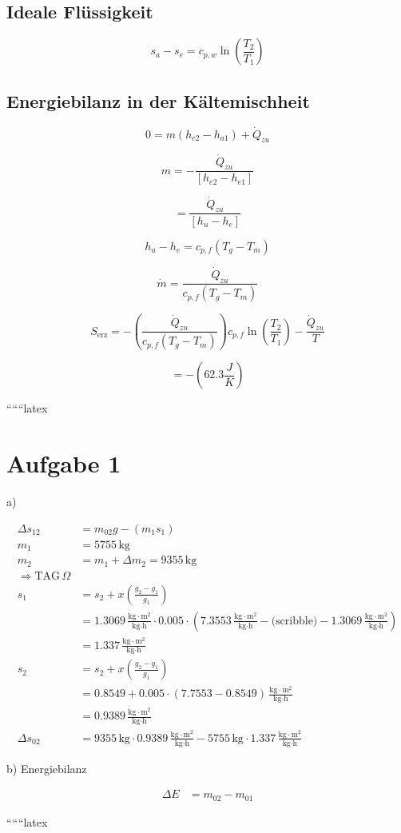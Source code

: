 \subsection*{Ideale Flüssigkeit}

\[
s_a - s_e = c_{p,w} \ln \left( \frac{T_2}{T_1} \right)
\]

\subsection*{Energiebilanz in der Kältemischheit}

\[
0 = m \left( h_{e2} - h_{a1} \right) + \dot{Q}_{zu}
\]

\[
m = - \frac{\dot{Q}_{zu}}{\left[ h_{e2} - h_{e1} \right]}
\]

\[
= \frac{\dot{Q}_{zu}}{\left[ h_{u} - h_{e} \right]}
\]

\[
h_u - h_e = c_{p,f} \left( T_g - T_m \right)
\]

\[
\dot{m} = \frac{\dot{Q}_{zu}}{c_{p,f} \left( T_g - T_m \right)}
\]

\[
S_{\text{erz}} = - \left( \frac{\dot{Q}_{zu}}{c_{p,f} \left( T_g - T_m \right)} \right) c_{p,f} \ln \left( \frac{T_2}{T_1} \right) - \frac{\dot{Q}_{zu}}{T}
\]

\[
= - \left( 62.3 \frac{J}{K} \right)
\]

``````latex


\section*{Aufgabe 1}

a)

\begin{align*}
\Delta s_{12} &= m_{02}g - (m_1 s_1) \\
m_1 &= 5755 \, \text{kg} \\
m_2 &= m_1 + \Delta m_2 = 9355 \, \text{kg} \\
\Rightarrow \text{TAG} \, \Omega \\
s_1 &= s_2 + x \left( \frac{g_2 - g_1}{g_1} \right) \\
&= 1.3069 \, \frac{\text{kg} \cdot \text{m}^2}{\text{kg} \cdot \text{h}} \cdot 0.005 \cdot (7.3553 \, \frac{\text{kg} \cdot \text{m}^2}{\text{kg} \cdot \text{h}} - \text{(scribble)} - 1.3069 \, \frac{\text{kg} \cdot \text{m}^2}{\text{kg} \cdot \text{h}}) \\
&= 1.337 \, \frac{\text{kg} \cdot \text{m}^2}{\text{kg} \cdot \text{h}} \\
s_2 &= s_2 + x \left( \frac{g_2 - g_1}{g_1} \right) \\
&= 0.8549 + 0.005 \cdot (7.7553 - 0.8549) \, \frac{\text{kg} \cdot \text{m}^2}{\text{kg} \cdot \text{h}} \\
&= 0.9389 \, \frac{\text{kg} \cdot \text{m}^2}{\text{kg} \cdot \text{h}} \\
\Delta s_{02} &= 9355 \, \text{kg} \cdot 0.9389 \, \frac{\text{kg} \cdot \text{m}^2}{\text{kg} \cdot \text{h}} - 5755 \, \text{kg} \cdot 1.337 \, \frac{\text{kg} \cdot \text{m}^2}{\text{kg} \cdot \text{h}}
\end{align*}

b) Energiebilanz

\begin{align*}
\Delta E &= m_{02} - m_{01}
\end{align*}

``````latex



